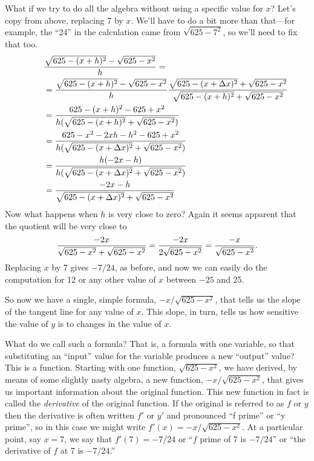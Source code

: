 What if we try to do all the algebra without using a specific
value for $x$? Let's copy from above, replacing 7 by  $x$. We'll have
to do a bit more than that---for example, 
the ``24'' in the calculation came from 
$\sqrt{625-7^2}$, so we'll need to fix that too.
\begin{align*}
&{\sqrt{625-(x+ h)^2} - \sqrt{625-x^2}\over  h}= \\
\qquad&={\sqrt{625-(x+ h)^2} - \sqrt{625-x^2}\over  h}{\sqrt{625-(x+\Delta
    x)^2}+\sqrt{625-x^2}\over \sqrt{625-(x+ h)^2}+\sqrt{625-x^2}} \\
&={625-(x+ h)^2-625+x^2\over  h(\sqrt{625-(x+ h)^2}+\sqrt{625-x^2})} \\
&={625-x^2-2x h- h^2-625+x^2\over   h(\sqrt{625-(x+\Delta
    x)^2}+\sqrt{625-x^2})} \\
&={ h(-2x- h)\over  h(\sqrt{625-(x+\Delta
    x)^2}+\sqrt{625-x^2})} \\
&= {-2x- h\over\sqrt{625-(x+\Delta
    x)^2}+\sqrt{625-x^2}} \\
\end{align*}
Now what happens when $h$ is very close to zero? Again it seems
apparent that the quotient will be very close to
$${-2x\over \sqrt{625-x^2}+\sqrt{625-x^2}}
={-2x\over 2\sqrt{625-x^2}}={-x\over \sqrt{625-x^2}}.
$$
Replacing $x$ by 7 gives $-7/24$, as before, and now we can easily do
the computation for 12  or any other value of
$x$ between $-25$ and 25.

So now we have a single, simple formula, ${-x/ \sqrt{625-x^2}}$,
that tells us the slope of the tangent line for any value of
$x$. This slope, in turn, tells us how sensitive the value of $y$ is
to changes in the value of $x$. 

What do we call such a formula? That is, a formula with one variable,
so that substituting an ``input'' value for the variable produces a
new ``output'' value? This is a function. Starting with one function,
$\sqrt{625-x^2}$, we have derived, by means of some slightly nasty
algebra, a new function, ${-x/ \sqrt{625-x^2}}$, that gives us
important information about the original function. This new function
in fact is called the \textit{derivative} of the
original function. If the original is referred to as $f$ or $y$ then
the derivative is often written $f'$ or $y'$ and pronounced ``f
prime'' or ``y prime'', so in this case we might write $f'(x)=-x/
\sqrt{625-x^2}$. At a particular point, say $x=7$, we say that
$f'(7)=-7/24$ or ``$f$ prime of 7 is $-7/24$'' or ``the derivative of
$f$ at 7 is $-7/24$.''

